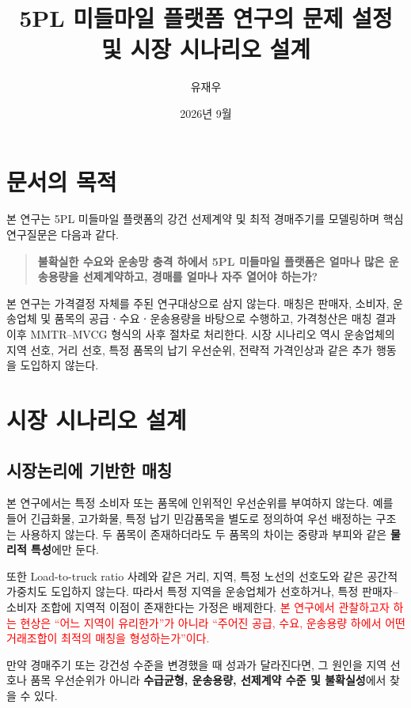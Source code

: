 \documentclass[11pt,a4paper]{article}
\title{\textbf{5PL 미들마일 플랫폼 연구의 문제 설정 및 시장 시나리오 설계}}
\author{유재우}
\date{2026년 9월}
\begin{document}
\maketitle

\section{문서의 목적}

본 연구는 5PL 미들마일 플랫폼의 강건 선제계약 및 최적 경매주기를 모델링하며 핵심 연구질문은 다음과 같다.

\begin{quote}
\textbf{불확실한 수요와 운송망 충격 하에서 5PL 미들마일 플랫폼은 얼마나 많은 운송용량을 선제계약하고,
경매를 얼마나 자주 열어야 하는가?}
\end{quote}

본 연구는 가격결정 자체를 주된 연구대상으로 삼지 않는다.
매칭은 판매자, 소비자, 운송업체 및 품목의 공급ㆍ수요ㆍ운송용량을 바탕으로 수행하고,
가격청산은 매칭 결과 이후 MMTR--MVCG 형식의 사후 절차로 처리한다.
시장 시나리오 역시 운송업체의 지역 선호, 거리 선호, 특정 품목의 납기 우선순위, 전략적 가격인상과 같은 추가 행동을 도입하지 않는다.

\section{시장 시나리오 설계}

\subsection{시장논리에 기반한 매칭}

본 연구에서는 특정 소비자 또는 품목에 인위적인 우선순위를 부여하지 않는다.
예를 들어 긴급화물, 고가화물, 특정 납기 민감품목을 별도로 정의하여 우선 배정하는 구조는 사용하지 않는다.
두 품목이 존재하더라도 두 품목의 차이는 중량과 부피와 같은 \textbf{물리적 특성}에만 둔다.

또한 Load-to-truck ratio 사례와 같은 거리, 지역, 특정 노선의 선호도와 같은 공간적 가중치도 도입하지 않는다.
따라서 특정 지역을 운송업체가 선호하거나, 특정 판매자--소비자 조합에 지역적 이점이 존재한다는 가정은 배제한다.
\textcolor{red}{본 연구에서 관찰하고자 하는 현상은 ``어느 지역이 유리한가''가 아니라 ``주어진 공급, 수요, 운송용량 하에서 어떤 거래조합이 최적의 매칭을 형성하는가''이다.}

만약 경매주기 또는 강건성 수준을 변경했을 때 성과가 달라진다면,
그 원인을 지역 선호나 품목 우선순위가 아니라
\textbf{수급균형, 운송용량, 선제계약 수준 및 불확실성}에서 찾을 수 있다.
\end{document}
